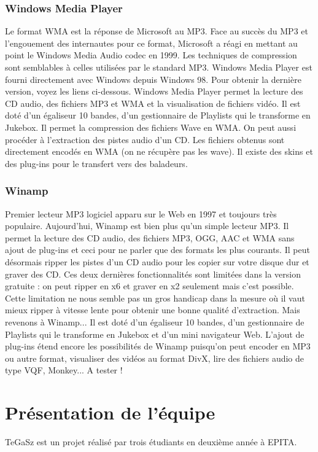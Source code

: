 \documentclass[12pt,a4paper]{report}
\begin{document}
\subsubsection{Windows Media Player}

Le format WMA est la réponse de Microsoft au MP3. Face au succès du MP3 et l'engouement des internautes pour ce format, Microsoft a réagi en mettant au point le Windows Media Audio codec en 1999. Les techniques de compression sont semblables à celles utilisées par le standard MP3. Windows Media Player est fourni directement avec Windows depuis Windows 98. Pour obtenir la dernière version, voyez les liens ci-dessous. Windows Media Player permet la lecture des CD audio, des fichiers MP3 et WMA et la visualisation de fichiers vidéo. Il est doté d'un égaliseur 10 bandes, d'un gestionnaire de Playlists qui le transforme en Jukebox. Il permet la compression des fichiers Wave en WMA. On peut aussi procéder à l'extraction des pistes audio d'un CD. Les fichiers obtenus sont directement encodés en WMA (on ne récupère pas les wave). Il existe des skins et des plug-ins pour le transfert vers des baladeurs.

\subsubsection{Winamp}

Premier lecteur MP3 logiciel apparu sur le Web en 1997 et toujours très populaire. Aujourd'hui, Winamp est bien plus qu'un simple lecteur MP3. Il permet la lecture des CD audio, des fichiers MP3, OGG, AAC et WMA sans ajout de plug-ins et ceci pour ne parler que des formats les plus courants. Il peut désormais ripper les pistes d'un CD audio pour les copier sur votre disque dur et graver des CD. Ces deux dernières fonctionnalités sont limitées dans la version gratuite : on peut ripper en x6 et graver en x2 seulement mais c'est possible. Cette limitation ne nous semble pas un gros handicap dans la mesure o\`u il vaut mieux ripper \`a  vitesse lente pour obtenir une bonne qualité d'extraction. Mais revenons \`a  Winamp... Il est doté d'un égaliseur 10 bandes, d'un gestionnaire de Playlists qui le transforme en Jukebox et d'un mini navigateur Web. 
L'ajout de plug-ins étend encore les possibilités de Winamp puisqu'on peut encoder en MP3 ou autre format, visualiser des vidéos au format DivX, lire des fichiers audio de type VQF, Monkey... A tester !

\section{Présentation de l'équipe}
TeGaSz est un projet réalisé par trois étudiants en deuxième année à EPITA.
\end{document}

